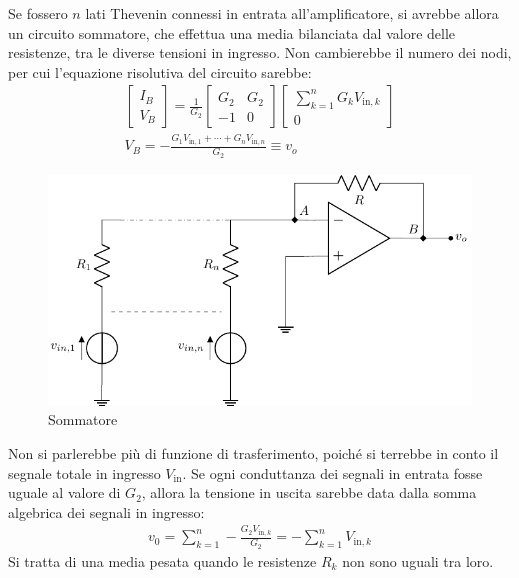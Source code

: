 \documentclass{article}
\numberwithin{equation}{subsection}
\begin{document}
Se fossero $n$ lati Thevenin connessi in entrata all'amplificatore, si avrebbe allora un circuito sommatore, che effettua una 
media bilanciata dal valore delle resistenze, tra le diverse tensioni in ingresso. Non cambierebbe il numero dei nodi, per cui l'equazione risolutiva 
del circuito sarebbe:
\begin{gather*}
    \begin{bmatrix}
        I_B\\V_B
    \end{bmatrix}=\displaystyle\frac{1}{G_2}\begin{bmatrix}
        G_2&G_2\\-1&0
    \end{bmatrix}\begin{bmatrix}
        \displaystyle\sum_{k=1}^nG_kV_{\mathrm{in},k}\\0
    \end{bmatrix}\\
    V_B=\displaystyle-\frac{G_1V_{\mathrm{in},1}+\cdots+G_nV_{\mathrm{in},n}}{G_2}\equiv v_o
\end{gather*}
\begin{figure}[H]%
    \centering
    \includegraphics{amplificatore-sommatore.pdf}%
    \caption{Sommatore}
    \label{fig:amplificatore-sommatore}
\end{figure}
Non si parlerebbe più di funzione di trasferimento, poiché si terrebbe in conto il segnale totale in ingresso $V_\mathrm{in}$. 
Se ogni conduttanza dei segnali in entrata fosse uguale al valore di $G_2$, allora la tensione in uscita sarebbe data dalla somma algebrica dei 
segnali in ingresso:
\begin{gather*}
    v_0=\displaystyle\sum_{k=1}^n-\frac{G_2V_{\mathrm{in},k}}{G_2}=-\sum_{k=1}^nV_{\mathrm{in},k}
\end{gather*}
Si tratta di una media pesata quando le resistenze $R_k$ non sono uguali tra loro. 
\end{document}
